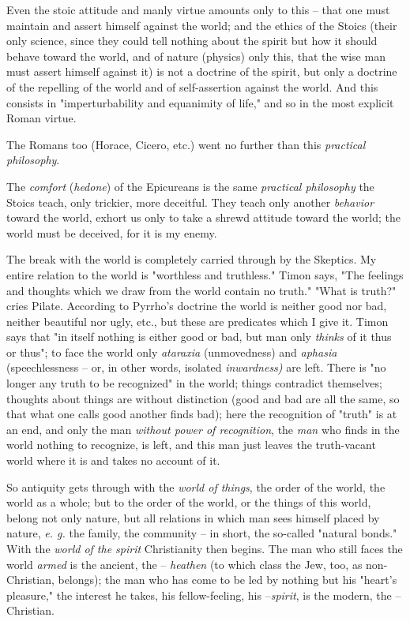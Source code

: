 Even the stoic attitude and manly virtue amounts only to this -- that one must 
maintain and assert himself against the world; and the ethics of the Stoics 
(their only science, since they could tell nothing about the spirit but how it 
should behave toward the world, and of nature (physics) only this, that the 
wise man must assert himself against it) is not a doctrine of the spirit, but 
only a doctrine of the repelling of the world and of self-assertion against 
the world. And this consists in "{}imperturbability and equanimity of life,"{} 
and so in the most explicit Roman virtue.

The Romans too (Horace, Cicero, etc.) went no further than this 
\textit{practical philosophy}.

The \textit{comfort} (\textit{hedone}) of the Epicureans is the same 
\textit{practical philosophy} the Stoics teach, only trickier, more deceitful. 
They teach only another \textit{behavior} toward the world, exhort us only to 
take a shrewd attitude toward the world; the world must be deceived, for it is 
my enemy.

The break with the world is completely carried through by the Skeptics. My 
entire relation to the world is "{}worthless and truthless."{} Timon says, 
"{}The feelings and thoughts which we draw from the world contain no truth."{} 
"{}What is truth?"{} cries Pilate. According to Pyrrho's doctrine the world is 
neither good nor bad, neither beautiful nor ugly, etc., but these are 
predicates which I give it. Timon says that "{}in itself nothing is either 
good or bad, but man only \textit{thinks} of it thus or thus"{}; to face the 
world only \textit{ataraxia} (unmovedness) and \textit{aphasia} 
(speechlessness -- or, in other words, isolated \textit{inwardness)} are left. 
There is "{}no longer any truth to be recognized"{} in the world; things 
contradict themselves; thoughts about things are without distinction (good and 
bad are all the same, so that what one calls good another finds bad); here the 
recognition of "{}truth"{} is at an end, and only the man \textit{without 
power of recognition}, the \textit{man} who finds in the world nothing to 
recognize, is left, and this man just leaves the truth-vacant world where it 
is and takes no account of it.

So antiquity gets through with the \textit{world of things}, the order of the 
world, the world as a whole; but to the order of the world, or the things of 
this world, belong not only nature, but all relations in which man sees 
himself placed by nature, \textit{e. g.} the family, the community -- in 
short, the so-called "{}natural bonds."{} With the \textit{world of the 
spirit} Christianity then begins. The man who still faces the world 
\textit{armed} is the ancient, the -- \textit{heathen} (to which class the 
Jew, too, as non-Christian, belongs); the man who has come to be led by 
nothing but his "{}heart's pleasure,"{} the interest he takes, his 
fellow-feeling, his --\textit{spirit}, is the modern, the -- Christian.

